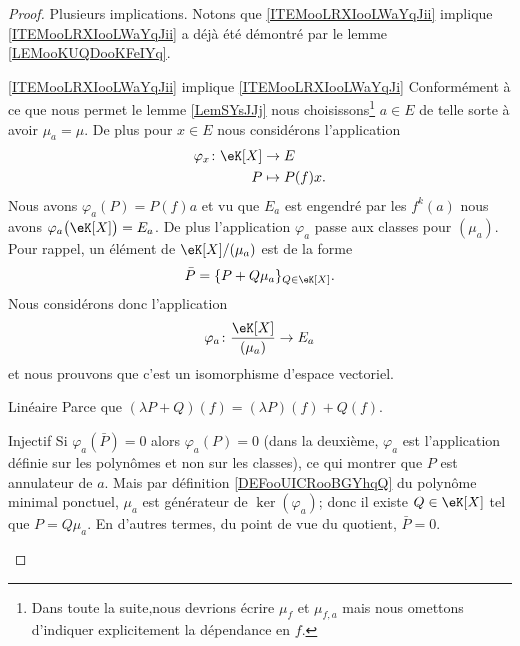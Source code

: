 \begin{proof}
    Plusieurs implications. Notons que \ref{ITEMooLRXIooLWaYqJii} implique \ref{ITEMooLRXIooLWaYqJii} a déjà été démontré par le lemme \ref{LEMooKUQDooKFeIYq}.
    \begin{subproof}
        \item[\ref{ITEMooLRXIooLWaYqJii} implique \ref{ITEMooLRXIooLWaYqJi}]
            Conformément à ce que nous permet le lemme \ref{LemSYsJJj} nous choisissons\footnote{Dans toute la suite,nous devrions écrire \( \mu_f\) et \( \mu_{f,a}\) mais nous omettons d'indiquer explicitement la dépendance en \( f\).} \( a\in E\) de telle sorte à avoir \( \mu_a=\mu\). De plus pour \( x\in E\) nous considérons l'application
            \begin{equation}
                \begin{aligned}
                    \varphi_x\colon \eK[X]&\to E \\
                    P&\mapsto P(f)x. 
                \end{aligned}
            \end{equation}
            Nous avons \( \varphi_a(P)=P(f)a\) et vu que \( E_{a}\) est engendré par les \( f^k(a)\) nous avons \( \varphi_a\big( \eK[X] \big)=E_a\). De plus l'application \( \varphi_a\) passe aux classes pour \( (\mu_a)\). Pour rappel, un élément de \( \eK[X]/(\mu_a)\) est de la forme
            \begin{equation}
                \bar P=\{ P+Q\mu_a \}_{Q\in \eK[X]}.
            \end{equation}
            Nous considérons donc l'application
            \begin{equation}
                \varphi_a\colon \frac{ \eK[X] }{ (\mu_a) }\to E_a
            \end{equation}
            et nous prouvons que c'est un isomorphisme d'espace vectoriel.
            \begin{subproof}
                \item[Linéaire]
                    Parce que \( (\lambda P+Q)(f)=(\lambda P)(f)+Q(f)\).
                \item[Injectif]
                    Si \( \varphi_a(\bar P)=0\) alors \( \varphi_a(P)=0\) (dans la deuxième, \( \varphi_a\) est l'application définie sur les polynômes et non sur les classes), ce qui montrer que \( P\) est annulateur de \( a\). Mais par définition \ref{DEFooUICRooBGYhqQ} du polynôme minimal ponctuel, \( \mu_a\) est générateur de \( \ker(\varphi_a)\); donc il existe \( Q\in \eK[X]\) tel que \( P=Q\mu_a\). En d'autres termes, du point de vue du quotient, \( \bar P=0\).

\end{subproof}
\end{subproof}
\end{proof}
